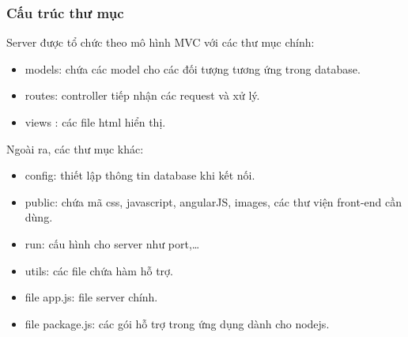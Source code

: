 \documentclass[a4paper,12pt,oneside]{article}
\begin{document}
\subsubsection{Cấu trúc thư mục}

Server được tổ chức theo mô hình MVC với các thư mục chính:
\begin{itemize}
\item models: chứa các model cho các đối tượng tương ứng trong database.
\item routes: controller tiếp nhận các request và xử lý.
\item views : các file html hiển thị.
\end{itemize}

Ngoài ra, các thư mục khác:
\begin{itemize}
\item config: thiết lập thông tin database khi kết nối.
\item public: chứa mã css, javascript, angularJS, images, các thư viện front-end cần dùng.
\item run: cấu hình cho server như port,…
\item utils: các file chứa hàm hỗ trợ.
\item file app.js: file server chính.
\item file package.js: các gói hỗ trợ trong ứng dụng dành cho nodejs.
\end{itemize}
\end{document}

